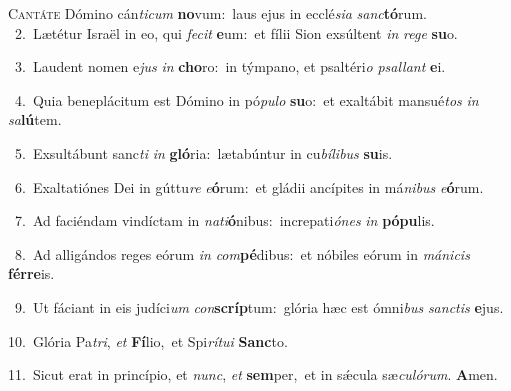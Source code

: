 \lettrine{\initial\textcolor{\initialcolor}{C}}{antáte} Dómino cán\-\textit{ti}\-\textit{cum} \textbf{no}\-vum:~\star laus ejus in ecclé\-\textit{si}\-\textit{a} \textit{sanc}\-\textbf{tó}rum.\\
{\numbfont\textcolor{\numbcolor}{~2.}}~Lætétur Israël in eo, qui \textit{fe}\-\textit{cit} \textbf{e}\-um:~\star et fílii Sion exsúltent \textit{in} \textit{re}\-\textit{ge} \textbf{su}\-o.\par
{\numbfont\textcolor{\numbcolor}{~3.}}~Laudent nomen e\textit{jus} \textit{in} \textbf{cho}\-ro:~\star in týmpano, et psaltéri\textit{o} \textit{psal}\-\textit{lant} \textbf{e}\-i.\par
{\numbfont\textcolor{\numbcolor}{~4.}}~Quia beneplácitum est Dómino in pó\-\textit{pu}\-\textit{lo} \textbf{su}\-o:~\star et exaltábit mansué\textit{tos} \textit{in} \textit{sa}\-\textbf{lú}tem.\par
{\numbfont\textcolor{\numbcolor}{~5.}}~Exsultábunt sanc\textit{ti} \textit{in} \textbf{gló}\-ria:~\star lætabúntur in cu\-\textit{bí}\-\textit{li}\textit{bus} \textbf{su}\-is.\par
{\numbfont\textcolor{\numbcolor}{~6.}}~Exaltatiónes Dei in gúttu\textit{re} \textit{e}\-\textbf{ó}rum:~\star et gládii ancípites in má\-\textit{ni}\-\textit{bus} \textit{e}\-\textbf{ó}rum.\par
{\numbfont\textcolor{\numbcolor}{~7.}}~Ad faciéndam vindíctam in \textit{na}\-\textit{ti}\textbf{ó}nibus:~\star increpati\-\textit{ó}\-\textit{nes} \textit{in} \textbf{pó}\-\textbf{pu}lis.\par
{\numbfont\textcolor{\numbcolor}{~8.}}~Ad alligándos reges eórum \textit{in} \textit{com}\-\textbf{pé}dibus:~\star et nóbiles eórum in \textit{má}\-\textit{ni}\textit{cis} \textbf{fér}\-\textbf{re}is.\par
{\numbfont\textcolor{\numbcolor}{~9.}}~Ut fáciant in eis judíci\textit{um} \textit{con}\-\textbf{scríp}tum:~\star glória hæc est ómni\textit{bus} \textit{sanc}\-\textit{tis} \textbf{e}\-jus.\par
{\numbfont\textcolor{\numbcolor}{10.}}~Glória Pa\-\textit{tri}\-, \textit{et} \textbf{Fí}\-lio,~\star et Spi\-\textit{rí}\-\textit{tu}\textit{i} \textbf{Sanc}\-to.\par
{\numbfont\textcolor{\numbcolor}{11.}}~Sicut erat in princípio, et \textit{nunc}\-, \textit{et} \textbf{sem}\-per,~\star et in sǽcula sæ\-\textit{cu}\-\textit{ló}\textit{rum}. \textbf{A}\-men.\par
